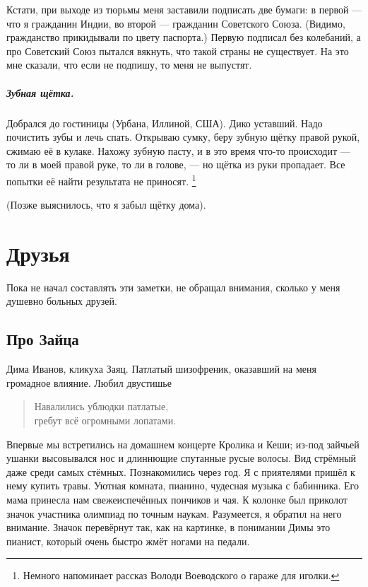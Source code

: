 \documentclass{book}
\begin{document}
Кстати, при выходе из тюрьмы меня заставили подписать две бумаги: в первой --- что я гражданин Индии, во второй --- гражданин Советского Союза.
(Видимо, гражданство прикидывали по цвету паспорта.)
Первую подписал без колебаний, а про Советский Союз пытался вякнуть, что такой страны не существует.
На это мне сказали, что если не подпишу, то меня не выпустят. 

\paragraph{Зубная щётка.}
Добрался до гостиницы (Урбана, Иллиной, США).
Дико уставший.
Надо почистить зубы и лечь спать.
Открываю сумку, беру зубную щётку правой рукой, сжимаю её в кулаке.
Нахожу зубную пасту, и в это время что-то происходит --- то ли в моей правой руке, то ли в голове, --- но щётка из руки пропадает.
Все попытки её найти результата не приносят.%
\footnote{Немного напоминает рассказ Володи Воеводского о гараже для иголки.}

(Позже выяснилось, что я забыл щётку дома).



\chapter*{Друзья}

Пока не начал составлять эти заметки, не обращал внимания, сколько у меня душевно больных друзей.

\section*{Про Зайца}

Дима Иванов, кликуха Заяц.
Патлатый шизофреник, оказавший на меня громадное влияние.
Любил двустишье
\begin{verse}
Навалились ублюдки патлатые,\\
\quad
гребут всё огромными лопатами.
\end{verse}

Впервые мы встретились на домашнем концерте Кролика и Кеши;
из-под зайчьей ушанки высовывался нос и длиннющие спутанные русые волосы.
Вид стрёмный даже среди самых стёмных.
Познакомились через год.
Я с приятелями пришёл к нему купить травы.
Уютная комната, пианино, чудесная музыка с бабинника.
Его мама принесла нам свежеиспечённых пончиков и чая.
К колонке был приколот значок участника олимпиад по точным наукам.
Разумеется, я обратил на него внимание.
Значок перевёрнут так, как на картинке, в понимании Димы это пианист, который очень быстро жмёт ногами на педали.
\end{document}
